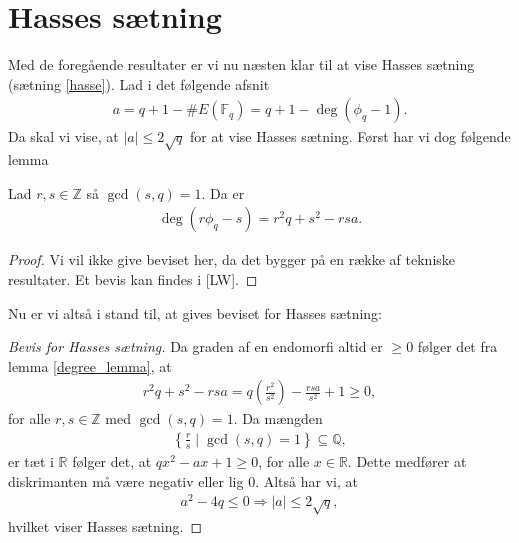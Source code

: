 \section{Hasses sætning}
Med de foregående resultater er vi nu næsten klar til at vise Hasses sætning (sætning \ref{hasse}). Lad i det følgende afsnit
\begin{align}
	a = q + 1 - \#E(\mathbb{F}_q) = q + 1 - \deg(\phi_q - 1).
\end{align}
Da skal vi vise, at $|a| \leq 2 \sqrt{q}$ for at vise Hasses sætning. Først har vi dog følgende lemma

\begin{lemma}
\label{degree_lemma}
Lad $r, s \in \mathbb{Z}$ så $\gcd(s, q) = 1$. Da er 
\begin{align*}
	\deg(r \phi_q - s) = r^2 q + s^2 - rsa.
\end{align*}
\end{lemma}
\begin{proof}
Vi vil ikke give beviset her, da det bygger på en række af tekniske resultater. Et bevis kan findes i [LW].
\end{proof}

Nu er vi altså i stand til, at gives beviset for Hasses sætning:

\begin{proof}[Bevis for Hasses sætning]
Da graden af en endomorfi altid er $\geq 0$ følger det fra lemma \ref{degree_lemma}, at 
\begin{align*}
	r^2q+s^2 -rsa = q \left( \frac{r^2}{s^2} \right) - \frac{rsa}{s^2} + 1 
	\geq 0,
\end{align*}
for alle $r, s \in \mathbb{Z}$ med $\gcd(s, q)=1$. Da mængden
\begin{align*}
	\left\{ \frac{r}{s} \mid \gcd(s, q)=1 \right\} \subseteq \mathbb{Q},
\end{align*}
er tæt i $\mathbb{R}$ følger det, at $qx^2 - ax + 1 \geq 0$,
for alle $x \in \mathbb{R}$. Dette medfører at diskrimanten må være negativ eller lig $0$.
Altså har vi, at 
\begin{align*}
	a^2 - 4q \leq 0 \Rightarrow |a| \leq 2 \sqrt{q},
\end{align*}
hvilket viser Hasses sætning.
\end{proof}


